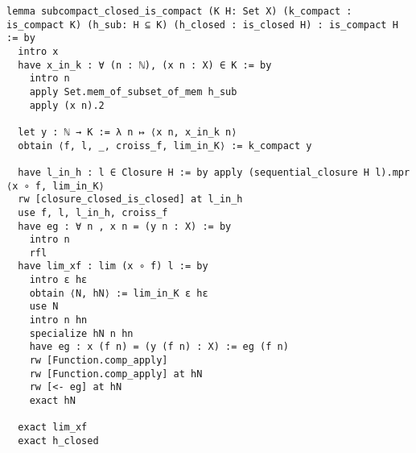 \documentclass[a4paper, 12pt]{article}
\begin{document}
\begin{verbatim}
lemma subcompact_closed_is_compact (K H: Set X) (k_compact : is_compact K) (h_sub: H ⊆ K) (h_closed : is_closed H) : is_compact H := by
  intro x
  have x_in_k : ∀ (n : ℕ), (x n : X) ∈ K := by
    intro n
    apply Set.mem_of_subset_of_mem h_sub
    apply (x n).2

  let y : ℕ → K := λ n ↦ ⟨x n, x_in_k n⟩
  obtain ⟨f, l, _, croiss_f, lim_in_K⟩ := k_compact y

  have l_in_h : l ∈ Closure H := by apply (sequential_closure H l).mpr ⟨x ∘ f, lim_in_K⟩
  rw [closure_closed_is_closed] at l_in_h
  use f, l, l_in_h, croiss_f
  have eg : ∀ n , x n = (y n : X) := by
    intro n
    rfl
  have lim_xf : lim (x ∘ f) l := by
    intro ε hε
    obtain ⟨N, hN⟩ := lim_in_K ε hε
    use N
    intro n hn
    specialize hN n hn
    have eg : x (f n) = (y (f n) : X) := eg (f n)
    rw [Function.comp_apply]
    rw [Function.comp_apply] at hN
    rw [<- eg] at hN
    exact hN

  exact lim_xf
  exact h_closed
\end{verbatim}
\end{document}
